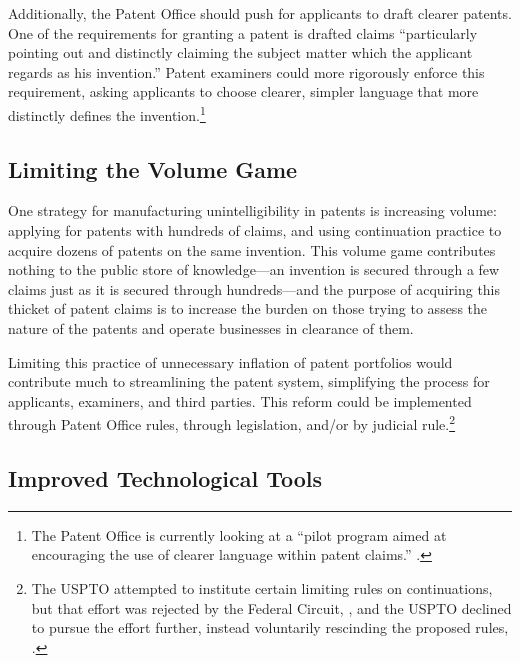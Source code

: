 \documentclass[11pt,twocolumn,titlepage]{article}
\begin{document}
Additionally, the Patent Office should push for applicants to draft clearer
patents. One of the requirements for granting a patent is drafted claims
``particularly pointing out and distinctly claiming the subject matter which the
applicant regards as his invention.''
Patent examiners could more rigorously
enforce this requirement, asking applicants to choose clearer, simpler language
that more distinctly defines the invention.\footnote{The Patent Office is
currently looking at a ``pilot program aimed at encouraging the use of clearer
language within patent claims.'' .}

\subsection{Limiting the Volume Game}
\SectionNote
{}

One strategy for manufacturing unintelligibility in
patents is increasing volume: applying for patents with hundreds of claims, and
using continuation practice to acquire dozens of patents on the same
invention.
This volume game contributes nothing to the public store of knowledge---an
invention is secured through a few claims just as it is secured through
hundreds---and the purpose of acquiring this thicket of patent claims is to
increase the burden on those trying to assess the nature of the patents and
operate businesses in clearance of them.

Limiting this practice of unnecessary inflation of patent portfolios would
contribute much to streamlining the patent system, simplifying the process for
applicants, examiners, and third parties. This reform could be implemented
through Patent Office rules, through legislation, and/or by judicial
rule.\footnote{The USPTO attempted to institute certain limiting rules on
continuations, but that effort was rejected by the Federal Circuit, , and the USPTO declined to pursue the effort further, instead voluntarily
rescinding the proposed rules, .}

\subsection{Improved Technological Tools}
\SectionNote
\end{document}
